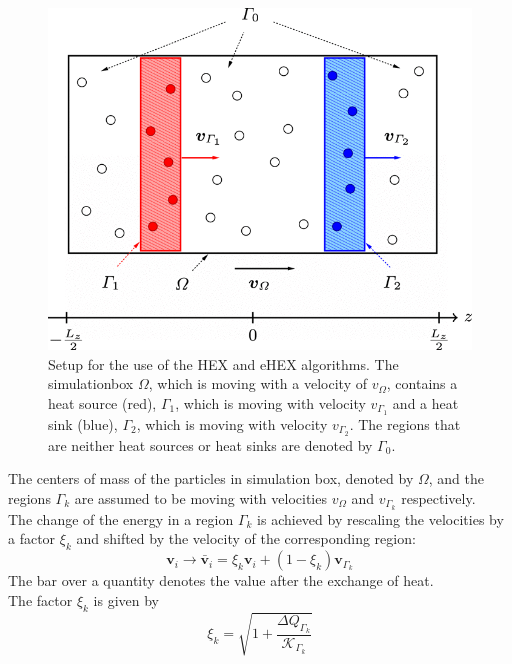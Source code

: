 \documentclass[12pt]{article}
\begin{document}
\begin{figure}
    \begin{center}
        \includegraphics[scale=0.3]{images/ehex_system.png}
        \caption{Setup for the use of the HEX and eHEX algorithms. The simulationbox $\Omega$, which is moving with a velocity of $v_\Omega$,
        contains a heat source (red), $\Gamma_1$, which is moving with velocity $v_{\Gamma_1}$ and a heat sink (blue), $\Gamma_2$, which is moving 
        with velocity $v_{\Gamma_2}$. The regions that are neither heat sources or heat sinks are denoted by $\Gamma_0$.}
        \label{fig:ehex} 
    \end{center}
\end{figure}
The centers of mass of the particles in simulation box, denoted by $\Omega$, and the regions $\Gamma_k$ 
are assumed to be moving with velocities $v_\Omega$ and $v_{\Gamma_k}$ respectively.\\
The change of the energy in a region $\Gamma_k$ is achieved by rescaling the velocities by a factor $\xi_k$ and shifted by the velocity of the
corresponding region:
\begin{equation}
    \mathbf{v}_i \rightarrow \mathbf{\bar{v}}_i = \xi_k \mathbf{v}_i + (1-\xi_k)\mathbf{v}_{\Gamma_k}
\end{equation}
The bar over a quantity denotes the value after the exchange of heat.\\
The factor $\xi_k$ is given by
\begin{equation}
    \xi_k = \sqrt{1+\frac{\Delta Q_{\Gamma_k}}{\mathcal{K}_{\Gamma_k}}}
\end{equation}
\end{document}
